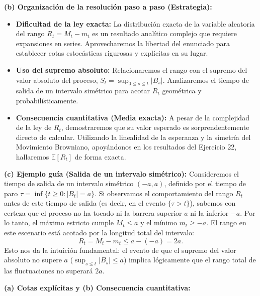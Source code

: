 \documentclass[11pt, letterpaper]{article}
\begin{document}
\vspace{5mm}

\begin{solucion}
    \textbf{(b) Organización de la resolución paso a paso (Estrategia):}
    \begin{itemize}
        \item[(i)] \textbf{Dificultad de la ley exacta:} La distribución exacta de la variable aleatoria del rango $R_t = M_t - m_t$ es un resultado analítico complejo que requiere expansiones en series. Aprovecharemos la libertad del enunciado para establecer cotas estocásticas rigurosas y explícitas en su lugar.
        \item[(ii)] \textbf{Uso del supremo absoluto:} Relacionaremos el rango con el supremo del valor absoluto del proceso, $S_t = \sup_{0 \le s \le t} |B_s|$. Analizaremos el tiempo de salida de un intervalo simétrico para acotar $R_t$ geométrica y probabilísticamente.
        \item[(iii)] \textbf{Consecuencia cuantitativa (Media exacta):} A pesar de la complejidad de la ley de $R_t$, demostraremos que su valor esperado es sorprendentemente directo de calcular. Utilizando la linealidad de la esperanza y la simetría del Movimiento Browniano, apoyándonos en los resultados del Ejercicio 22, hallaremos $\mathbb{E}[R_t]$ de forma exacta.
    \end{itemize}

    \vspace{3mm}
    \textbf{(c) Ejemplo guía (Salida de un intervalo simétrico):}
    Consideremos el tiempo de salida de un intervalo simétrico $(-a, a)$, definido por el tiempo de paro $\tau = \inf\{t \ge 0 : |B_t| = a\}$.
    Si observamos el comportamiento del rango $R_t$ antes de este tiempo de salida (es decir, en el evento $\{\tau > t\}$), sabemos con certeza que el proceso no ha tocado ni la barrera superior $a$ ni la inferior $-a$. 
    Por lo tanto, el máximo estricto cumple $M_t \le a$ y el mínimo $m_t \ge -a$. El rango en este escenario está acotado por la longitud total del intervalo: 
    \[ R_t = M_t - m_t \le a - (-a) = 2a. \]
    Esto nos da la intuición fundamental: el evento de que el supremo del valor absoluto no supere $a$ ($\sup_{s \le t} |B_s| \le a$) implica lógicamente que el rango total de las fluctuaciones no superará $2a$.

    \vspace{3mm}
    \textbf{(a) Cotas explícitas y (b) Consecuencia cuantitativa:}


\end{solucion}
\end{document}
